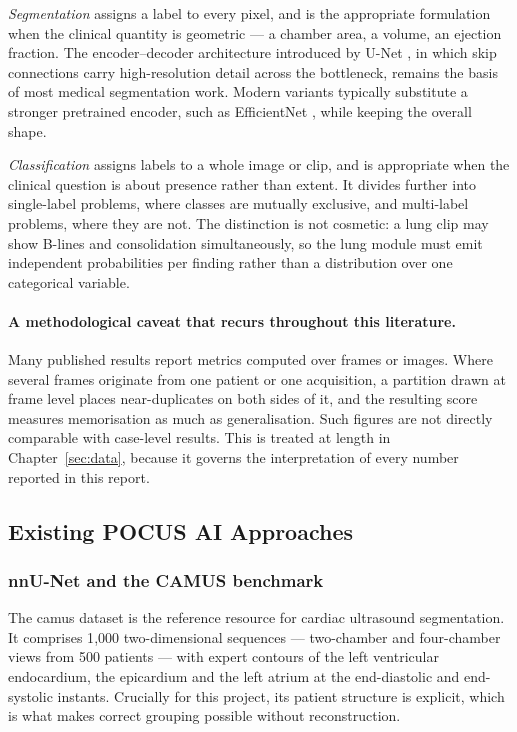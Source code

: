 \emph{Segmentation} assigns a label to every pixel, and is the appropriate formulation when
the clinical quantity is geometric --- a chamber area, a volume, an ejection fraction. The
encoder--decoder architecture introduced by U-Net \cite{ronneberger2015unet}, in which
skip connections carry high-resolution detail across the bottleneck, remains the basis of
most medical segmentation work. Modern variants typically substitute a stronger pretrained
encoder, such as EfficientNet \cite{tan2019efficientnet}, while keeping the overall shape.

\emph{Classification} assigns labels to a whole image or clip, and is appropriate when the
clinical question is about presence rather than extent. It divides further into
single-label problems, where classes are mutually exclusive, and multi-label problems,
where they are not. The distinction is not cosmetic: a lung clip may show B-lines and
consolidation simultaneously, so the lung module must emit independent probabilities per
finding rather than a distribution over one categorical variable.

\paragraph{A methodological caveat that recurs throughout this literature.} Many published
results report metrics computed over frames or images. Where several frames originate from
one patient or one acquisition, a partition drawn at frame level places near-duplicates on
both sides of it, and the resulting score measures memorisation as much as generalisation.
Such figures are not directly comparable with case-level results. This is treated at length
in Chapter~\ref{sec:data}, because it governs the interpretation of every number reported
in this report.

\subsection{Existing POCUS AI Approaches}
\label{subsec:sota-existing}

\subsubsection{nnU-Net and the CAMUS benchmark}

The \gls{camus} dataset \cite{leclerc2019camus} is the reference resource for cardiac
ultrasound segmentation. It comprises 1{,}000 two-dimensional sequences --- two-chamber and
four-chamber views from 500 patients --- with expert contours of the left ventricular
endocardium, the epicardium and the left atrium at the end-diastolic and end-systolic
instants. Crucially for this project, its patient structure is explicit, which is what
makes correct grouping possible without reconstruction.

